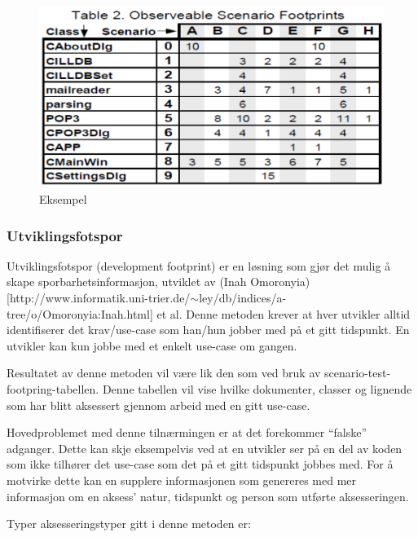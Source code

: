 \begin{figure}[htbp]
\centering
\includegraphics{Forelesning 03/img/5.png}
\caption{Eksempel}
\end{figure}

\subsubsection{Utviklingsfotspor}

Utviklingsfotspor (development footprint) er en løsning som gjør det
mulig å skape sporbarhetsinformasjon, utviklet av (Inah
Omoronyia){[}http://www.informatik.uni-trier.de/\ensuremath{\sim}ley/db/indices/a-tree/o/Omoronyia:Inah.html{]}
et al. Denne metoden krever at hver utvikler alltid identifiserer det
krav/use-case som han/hun jobber med på et gitt tidspunkt. En utvikler
kan kun jobbe med et enkelt use-case om gangen.

Resultatet av denne metoden vil være lik den som ved bruk av
scenario-test-footpring-tabellen. Denne tabellen vil vise hvilke
dokumenter, classer og lignende som har blitt aksessert gjennom arbeid
med en gitt use-case.

Hovedproblemet med denne tilnærmingen er at det forekommer ``falske''
adganger. Dette kan skje eksempelvis ved at en utvikler ser på en del av
koden som ikke tilhører det use-case som det på et gitt tidspunkt jobbes
med. For å motvirke dette kan en supplere informasjonen som genereres
med mer informasjon om en aksess' natur, tidspunkt og person som utførte
aksesseringen.

Typer aksesseringstyper gitt i denne metoden er:

